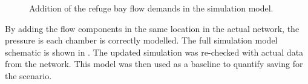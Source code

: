 	\begin{figure}[h]
		\centering
		\caption{Addition of the refuge bay flow demands in the simulation model.}
		\label{fig: Refuge bay layout}
	\end{figure}
	\par
	By adding the flow components in the same location in the actual network, the pressure is each chamber is correctly modelled. The full simulation model schematic is shown in . The updated simulation was re-checked with actual data from the network. This model was then used as a baseline to quantify saving for the scenario.
